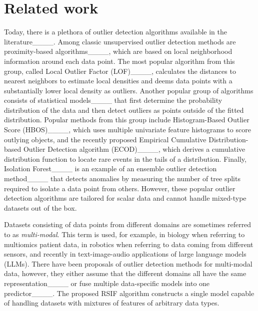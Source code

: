 \section{Related work}
\label{sec:related_work}
Today, there is a plethora of outlier detection algorithms available in the literature____. Among classic unsupervised outlier detection methods are proximity-based algorithms____, which are based on local neighborhood information around each data point. The most popular algorithm from this group, called Local Outlier Factor (LOF)____, calculates the distances to nearest neighbors to estimate local densities and deems data points with a substantially lower local density as outliers. Another popular group of algorithms consists of statistical models____ that first determine the probability distribution of the data and then detect outliers as points outside of the fitted distribution. Popular methods from this group include Histogram-Based Outlier Score (HBOS)____, which uses multiple univariate feature histograms to score outlying objects, and the recently proposed Empirical Cumulative Distribution-based Outlier Detection algorithm (ECOD)____, which derives a cumulative distribution function to locate rare events in the tails of a distribution. Finally, Isolation Forest____ is an example of an ensemble outlier detection method____ that detects anomalies by measuring the number of tree splits required to isolate a data point from others. However, these popular outlier detection algorithms are tailored for scalar data and cannot handle mixed-type datasets out of the box.

Datasets consisting of data points from different domains are sometimes referred to as \textit{multi-modal}. This term is used, for example, in biology when referring to multiomics patient data, in robotics when referring to data coming from different sensors, and recently in text-image-audio applications of large language models (LLMs). There have been proposals of outlier detection methods for multi-modal data, however, they either assume that the different domains all have the same representation____ or fuse multiple data-specific models into one predictor____. The proposed RSIF algorithm constructs a single model capable of handling datasets with mixtures of features of arbitrary data types.

